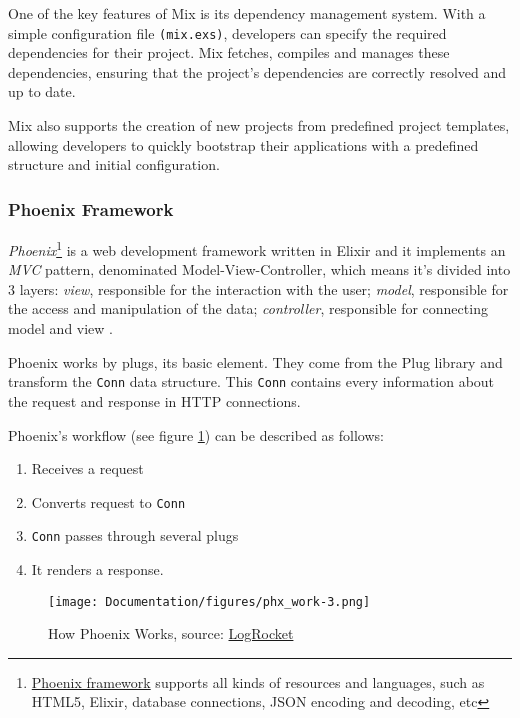 One of the key features of Mix is its dependency management system. With a simple configuration file \texttt{(mix.exs)}, developers can specify the required dependencies for their project. Mix fetches, compiles and manages these dependencies, ensuring that the project's dependencies are correctly resolved and up to date.

Mix also supports the creation of new projects from predefined project templates, allowing developers to quickly bootstrap their applications with a predefined structure and initial configuration.\newline


\subsubsection{Phoenix Framework}

\textit{Phoenix}\footnote{\href{https://www.phoenixframework.org}{Phoenix framework} supports all kinds of resources and languages, such as HTML5, Elixir, database connections, JSON encoding and decoding, etc} is a web development framework written in Elixir and it implements an \textit{MVC} pattern, denominated Model-View-Controller, which means it's divided into 3 layers: \textit{view}, responsible for the interaction with the user; \textit{model}, responsible for the access and manipulation of the data; \textit{controller}, responsible for connecting model and view \cite{phoenix}.\newline

Phoenix works by plugs, its basic element. They come from the Plug library and transform the \texttt{Conn} data structure. This \texttt{Conn} contains every information about the request and response in HTTP connections.\newline

Phoenix's workflow (see figure \ref{fig:phx_work}) can be described as follows:

\begin{enumerate}
    \item Receives a request
    \item Converts request to \texttt{Conn}
    \item \texttt{Conn} passes through several plugs
    \item It renders a response.
\end{enumerate}

\begin{figure}[htbp]
	\centering
	\texttt{[image: Documentation/figures/phx\_work-3.png]}  %
	\caption{How Phoenix Works, source: \href{https://blog.logrocket.com/build-rest-api-elixir-phoenix/}{LogRocket}}
	\label{fig:phx_work}
\end{figure}

